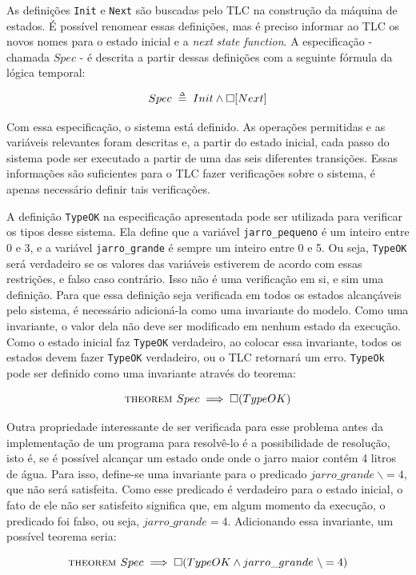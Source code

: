 As definições \texttt{Init} e \texttt{Next} são buscadas pelo TLC na construção da máquina de estados. É possível renomear essas definições, mas é preciso informar ao TLC os novos nomes para o estado inicial e a \textit{next state function}. A especificação - chamada $Spec$ - é descrita a partir dessas definições com a seguinte fórmula da lógica temporal:

\[Spec \;\mathrel{\smash {{\stackrel{\scriptscriptstyle\Delta}{=}}}}\; Init \land \square [Next]\]

Com essa especificação, o sistema está definido. As operações permitidas e as variáveis relevantes foram descritas e, a partir do estado inicial, cada passo do sistema pode ser executado a partir de uma das seis diferentes transições. Essas informações são suficientes para o TLC fazer verificações sobre o sistema, é apenas necessário definir tais verificações.

A definição \texttt{TypeOK} na especificação apresentada pode ser utilizada para verificar os tipos desse sistema. Ela define que a variável \texttt{jarro\_pequeno} é um inteiro entre 0 e 3, e a variável \texttt{jarro\_grande} é sempre um inteiro entre 0 e 5. Ou seja, \texttt{TypeOK} será verdadeiro se os valores das variáveis estiverem de acordo com essas restrições, e falso caso contrário. Isso não é uma verificação em si, e sim uma definição. Para que essa definição seja verificada em todos os estados alcançáveis pelo sistema, é necessário adicioná-la como uma invariante do modelo. Como uma invariante, o valor dela não deve ser modificado em nenhum estado da execução. Como o estado inicial faz \texttt{TypeOK} verdadeiro, ao colocar essa invariante, todos os estados devem fazer \texttt{TypeOK} verdadeiro, ou o TLC retornará um erro. \texttt{TypeOk} pode ser definido como uma invariante através do teorema:

\[\textsc{theorem } Spec \implies \square (TypeOK)\]

Outra propriedade interessante de ser verificada para esse problema antes da implementação de um programa para resolvê-lo é a possibilidade de resolução, isto é, se é possível alcançar um estado onde onde o jarro maior contém 4 litros de água. Para isso, define-se uma invariante para o predicado $jarro\_grande\ \backslash= 4$, que não será satisfeita. Como esse predicado é verdadeiro para o estado inicial, o fato de ele não ser satisfeito significa que, em algum momento da execução, o predicado foi falso, ou seja, $jarro\_grande = 4$. Adicionando essa invariante, um possível teorema seria:

\[\textsc{theorem } Spec \implies \square (TypeOK \land jarro\_grande\ \backslash= 4)\]

